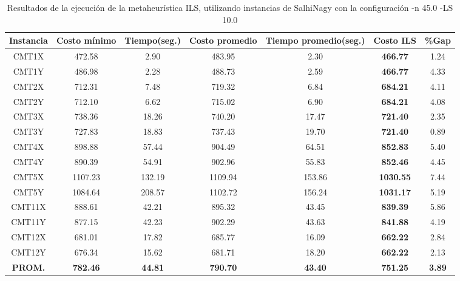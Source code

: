 \begin{table}[ht]
\caption{Resultados de la ejecución de la metaheurística ILS, utilizando instancias de SalhiNagy con la configuración -n 45.0 -LS 10.0}
\centering
\small
\begin{tabular}{c c c c c c c}
\hline\hline
Instancia & Costo mínimo & Tiempo(seg.) & Costo promedio & Tiempo promedio(seg.) & Costo ILS & \%Gap \\ [0.5ex]
\hline
CMT1X & 472.58 & 2.90 & 
483.95 & 2.30 & \bf{466.77} & 
1.24\\CMT1Y & 486.98 & 2.28 & 
488.73 & 2.59 & \bf{466.77} & 
4.33\\CMT2X & 712.31 & 7.48 & 
719.32 & 6.84 & \bf{684.21} & 
4.11\\CMT2Y & 712.10 & 6.62 & 
715.02 & 6.90 & \bf{684.21} & 
4.08\\CMT3X & 738.36 & 18.26 & 
740.20 & 17.47 & \bf{721.40} & 
2.35\\CMT3Y & 727.83 & 18.83 & 
737.43 & 19.70 & \bf{721.40} & 
0.89\\CMT4X & 898.88 & 57.44 & 
904.49 & 64.51 & \bf{852.83} & 
5.40\\CMT4Y & 890.39 & 54.91 & 
902.96 & 55.83 & \bf{852.46} & 
4.45\\CMT5X & 1107.23 & 132.19 & 
1109.94 & 153.86 & \bf{1030.55} & 
7.44\\CMT5Y & 1084.64 & 208.57 & 
1102.72 & 156.24 & \bf{1031.17} & 
5.19\\CMT11X & 888.61 & 42.21 & 
895.32 & 43.45 & \bf{839.39} & 
5.86\\CMT11Y & 877.15 & 42.23 & 
902.29 & 43.63 & \bf{841.88} & 
4.19\\CMT12X & 681.01 & 17.82 & 
685.77 & 16.09 & \bf{662.22} & 
2.84\\CMT12Y & 676.34 & 15.62 & 
681.71 & 18.20 & \bf{662.22} & 
2.13\\\bf{PROM.} & 
\bf{782.46} & \bf{44.81} & \bf{790.70} & \bf{43.40} & \bf{751.25} & \bf{3.89}\\[1ex]\hline
\end{tabular}
\label{table:nonlin}
\end{table} \clearpage
